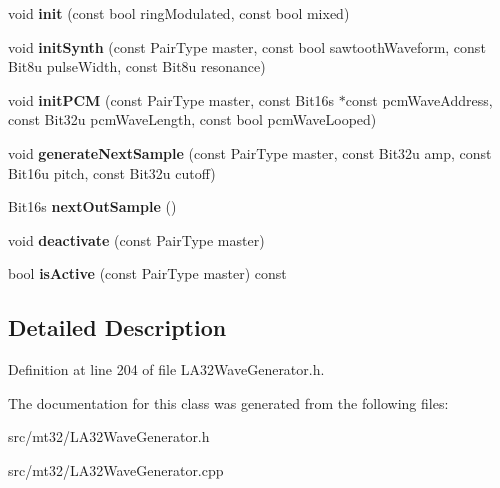 \begin{DoxyCompactItemize}
\item 
\hypertarget{classMT32Emu_1_1LA32PartialPair_a7769592bcb38c677bf4d4937a1a7f292}{void {\bfseries init} (const bool ring\-Modulated, const bool mixed)}\label{classMT32Emu_1_1LA32PartialPair_a7769592bcb38c677bf4d4937a1a7f292}

\item 
\hypertarget{classMT32Emu_1_1LA32PartialPair_ab8d3c264d62a5bbc69fd541e43b419ac}{void {\bfseries init\-Synth} (const Pair\-Type master, const bool sawtooth\-Waveform, const Bit8u pulse\-Width, const Bit8u resonance)}\label{classMT32Emu_1_1LA32PartialPair_ab8d3c264d62a5bbc69fd541e43b419ac}

\item 
\hypertarget{classMT32Emu_1_1LA32PartialPair_a7581724a39d513483567a19d27b68114}{void {\bfseries init\-P\-C\-M} (const Pair\-Type master, const Bit16s $\ast$const pcm\-Wave\-Address, const Bit32u pcm\-Wave\-Length, const bool pcm\-Wave\-Looped)}\label{classMT32Emu_1_1LA32PartialPair_a7581724a39d513483567a19d27b68114}

\item 
\hypertarget{classMT32Emu_1_1LA32PartialPair_a7c86235cb33b7ab3faafbc82b524262e}{void {\bfseries generate\-Next\-Sample} (const Pair\-Type master, const Bit32u amp, const Bit16u pitch, const Bit32u cutoff)}\label{classMT32Emu_1_1LA32PartialPair_a7c86235cb33b7ab3faafbc82b524262e}

\item 
\hypertarget{classMT32Emu_1_1LA32PartialPair_af8e6766879624354d1a298b1f5f76a1c}{Bit16s {\bfseries next\-Out\-Sample} ()}\label{classMT32Emu_1_1LA32PartialPair_af8e6766879624354d1a298b1f5f76a1c}

\item 
\hypertarget{classMT32Emu_1_1LA32PartialPair_a19edb5d2267ef3bb2414cc781ba3dbc4}{void {\bfseries deactivate} (const Pair\-Type master)}\label{classMT32Emu_1_1LA32PartialPair_a19edb5d2267ef3bb2414cc781ba3dbc4}

\item 
\hypertarget{classMT32Emu_1_1LA32PartialPair_ac78203e863d405adffb4e05e4a249625}{bool {\bfseries is\-Active} (const Pair\-Type master) const }\label{classMT32Emu_1_1LA32PartialPair_ac78203e863d405adffb4e05e4a249625}

\end{DoxyCompactItemize}


\subsection{Detailed Description}


Definition at line 204 of file L\-A32\-Wave\-Generator.\-h.



The documentation for this class was generated from the following files\-:\begin{DoxyCompactItemize}
\item 
src/mt32/L\-A32\-Wave\-Generator.\-h\item 
src/mt32/L\-A32\-Wave\-Generator.\-cpp\end{DoxyCompactItemize}
